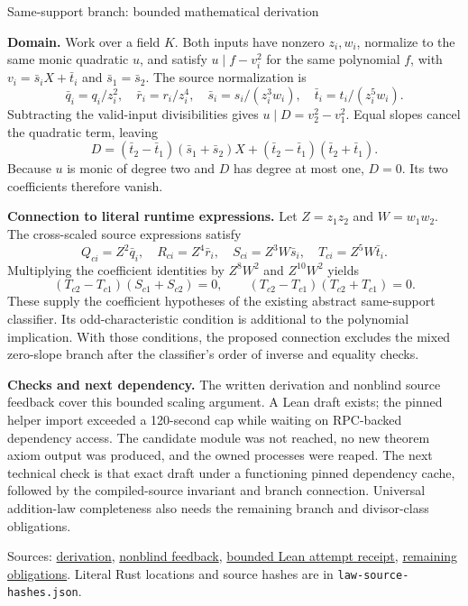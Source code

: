\documentclass[11pt]{article}
\newcommand{\Pbase}{/home/ec2-user/pencil-controller-review-20261029/c1-takeover-20261030}
\begin{document}
\newpage
{\Large Same-support branch: bounded mathematical derivation}

\textbf{Domain.} Work over a field $K$. Both inputs have nonzero $z_i,w_i$, normalize to the same monic quadratic $u$, and satisfy $u\mid f-v_i^2$ for the same polynomial $f$, with $v_i=\bar s_iX+\bar t_i$ and $\bar s_1=\bar s_2$. The source normalization is
\[
\bar q_i=q_i/z_i^2,\quad \bar r_i=r_i/z_i^4,\quad
\bar s_i=s_i/(z_i^3w_i),\quad \bar t_i=t_i/(z_i^5w_i).
\]
Subtracting the valid-input divisibilities gives $u\mid D=v_2^2-v_1^2$. Equal slopes cancel the quadratic term, leaving
\[
D=(\bar t_2-\bar t_1)(\bar s_1+\bar s_2)X
 +(\bar t_2-\bar t_1)(\bar t_2+\bar t_1).
\]
Because $u$ is monic of degree two and $D$ has degree at most one, $D=0$. Its two coefficients therefore vanish.

\textbf{Connection to literal runtime expressions.} Let $Z=z_1z_2$ and $W=w_1w_2$. The cross-scaled source expressions satisfy
\[
Q_{ci}=Z^2\bar q_i,\quad R_{ci}=Z^4\bar r_i,\quad
S_{ci}=Z^3W\bar s_i,\quad T_{ci}=Z^5W\bar t_i.
\]
Multiplying the coefficient identities by $Z^8W^2$ and $Z^{10}W^2$ yields
\[
(T_{c2}-T_{c1})(S_{c1}+S_{c2})=0,\qquad
(T_{c2}-T_{c1})(T_{c2}+T_{c1})=0.
\]
These supply the coefficient hypotheses of the existing abstract same-support classifier. Its odd-characteristic condition is additional to the polynomial implication. With those conditions, the proposed connection excludes the mixed zero-slope branch after the classifier's order of inverse and equality checks.

\textbf{Checks and next dependency.} The written derivation and nonblind source feedback cover this bounded scaling argument. A Lean draft exists; the pinned helper import exceeded a 120-second cap while waiting on RPC-backed dependency access. The candidate module was not reached, no new theorem axiom output was produced, and the owned processes were reaped. The next technical check is that exact draft under a functioning pinned dependency cache, followed by the compiled-source invariant and branch connection. Universal addition-law completeness also needs the remaining branch and divisor-class obligations.

Sources: \href{\Pbase/four-lead-inventory-resume/same-support-derivation.md}{derivation}, \href{\Pbase/four-lead-inventory-resume/same-support-independent-review.md}{nonblind feedback}, \href{\Pbase/four-lead-inventory-resume/lean-candidate/qualification-receipt.json}{bounded Lean attempt receipt}, \href{\Pbase/four-lead-inventory-resume/law-remaining-obligations.md}{remaining obligations}. Literal Rust locations and source hashes are in \texttt{law-source-hashes.json}.
\end{document}
